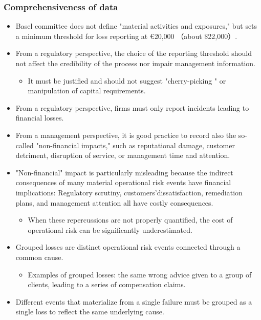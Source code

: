 \subsubsection{Comprehensiveness of data }
\begin{itemize}
\item Basel committee does not define "material activities and exposures," but sets a minimum threshold for loss reporting at €20,000 （about \$22,000）.
\item From a regulatory perspective, the choice of the reporting threshold should not affect the credibility of the process nor impair management information.
    \begin{itemize}
    \item It must be justified and should not suggest "cherry-picking " or manipulation of capital requirements.
    \end{itemize}
\item From a regulatory perspective, firms must only report incidents leading to financial losses.


\item  From a management perspective, it is good practice to record also the so-called "non-financial impacts," such as reputational damage, customer detriment, disruption of service, or management time and attention.
\item "Non-financial" impact is particularly misleading because the indirect consequences of many material operational risk events have financial implications: Regulatory scrutiny, customers'dissatisfaction, remediation plans, and management attention all have costly consequences.
    \begin{itemize}
    \item When these repercussions are not properly quantified, the cost of operational risk can be significantly underestimated.
    \end{itemize}
\item Grouped losses are distinct operational risk events connected through a common cause.
    \begin{itemize}
    \item Examples of grouped losses: the same wrong advice given to a group of clients, leading to a series of compensation
    claims.    
    \end{itemize}
\item Different events that materialize from a single failure must be grouped as a single loss to reflect the same underlying cause.
\end{itemize}




